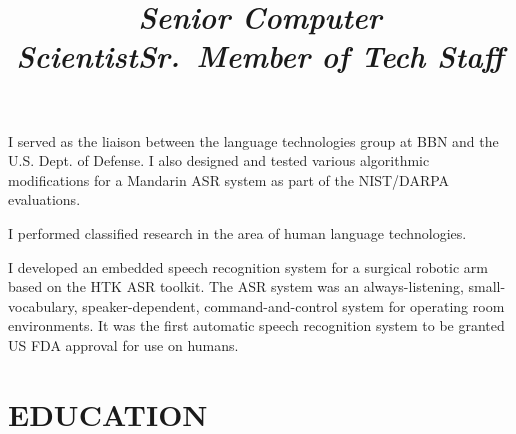 \documentclass[11pt]{res} %
\newcommand{\mysection}[1]{%
	\pagebreak[0]\section{#1}\vspace{1em}
}
\newenvironment{indentedblock*}[1][\parindent]
  {%
    \par
    \medskip
    \leftskip#1\relax
  }
  {%
    \par
    \medskip
  }
\begin{document}
\begin{resume}
\begin{position}
\vspace{-.4in}
\begin{indentedblock*}[.1in]

I served as the liaison between the language technologies group at BBN and the U.S. Dept. of Defense. I also designed and tested various algorithmic modifications for a Mandarin ASR system as part of the NIST/DARPA evaluations.

\end{indentedblock*}

\end{position}


\pagebreak[3]

\title{{\sl Senior Computer Scientist}}
\begin{position}

\vspace{-.4in}
\begin{indentedblock*}[.1in]

I performed classified research in the area of human language technologies.

\end{indentedblock*}

\end{position}



\pagebreak[0]

\title{{\sl Sr.\ Member of Tech Staff}}
\begin{position}

\vspace{-.4in}
\begin{indentedblock*}[.1in]

I developed an embedded speech recognition system for a surgical robotic arm based on the HTK ASR toolkit. The ASR system was an always-listening, small-vocabulary, speaker-dependent, command-and-control system for operating room environments. It was the first automatic speech recognition system to be granted US FDA approval for use on humans.

\end{indentedblock*}

\end{position}


\pagebreak[2]
\mysection{EDUCATION}


\end{resume}
\end{document}
